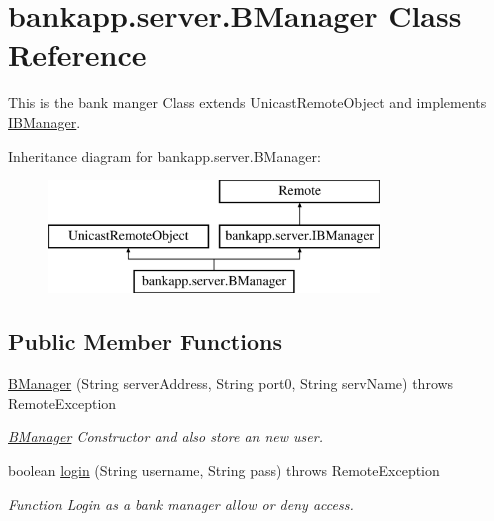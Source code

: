 \hypertarget{classbankapp_1_1server_1_1BManager}{}\section{bankapp.\+server.\+B\+Manager Class Reference}
\label{classbankapp_1_1server_1_1BManager}


This is the bank manger Class extends Unicast\+Remote\+Object and implements \hyperlink{interfacebankapp_1_1server_1_1IBManager}{I\+B\+Manager}.  


Inheritance diagram for bankapp.\+server.\+B\+Manager\+:\begin{figure}[H]
\begin{center}
\leavevmode
\includegraphics[height=3.000000cm]{classbankapp_1_1server_1_1BManager}
\end{center}
\end{figure}
\subsection*{Public Member Functions}
\begin{DoxyCompactItemize}
\item 
\hyperlink{classbankapp_1_1server_1_1BManager_aa7f45d3eddae4e91afaf2b19275b0c7e}{B\+Manager} (String server\+Address, String port0, String serv\+Name)  throws Remote\+Exception 
\begin{DoxyCompactList}\small\item\em \hyperlink{classbankapp_1_1server_1_1BManager}{B\+Manager} Constructor and also store an new user. \end{DoxyCompactList}\item 
boolean \hyperlink{classbankapp_1_1server_1_1BManager_abdeb5e23b534babeed067c3667fcafd3}{login} (String username, String pass)  throws Remote\+Exception 
\begin{DoxyCompactList}\small\item\em Function Login as a bank manager allow or deny access. \end{DoxyCompactList}\end{DoxyCompactItemize}


